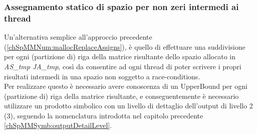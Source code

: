 \subsubsection[Assegnamento statico\\di spazio intermedio ai thread]
{Assegnamento statico  di spazio per non zeri intermedi ai thread} \label{chSpMMNum:preSplitAS_JA_tmp}
Un'alternativa semplice all'approccio precedente (\ref{chSpMMNum:mallocReplaceAssigns}),
è quello di effettuare una suddivisione per ogni (partizione di) riga della matrice risultante
dello spazio allocato in \emph{AS\_tmp JA\_tmp}, così da consentire ad ogni thread 
di poter scrivere i propri risultati intermedi in una spazio non soggetto a race-conditions.\\
Per realizzare questo è necessario avere conoscenza di un UpperBound per ogni (partizione di)
riga della matrice risultante, e conseguentemente è necessario utilizzare un prodotto simbolico
con un livello di dettaglio dell'output di livello 2 (3), 
seguendo la nomenclatura introdotta nel capitolo precedente \ref{chSpMMSymb:outputDetailLevel}.\\

